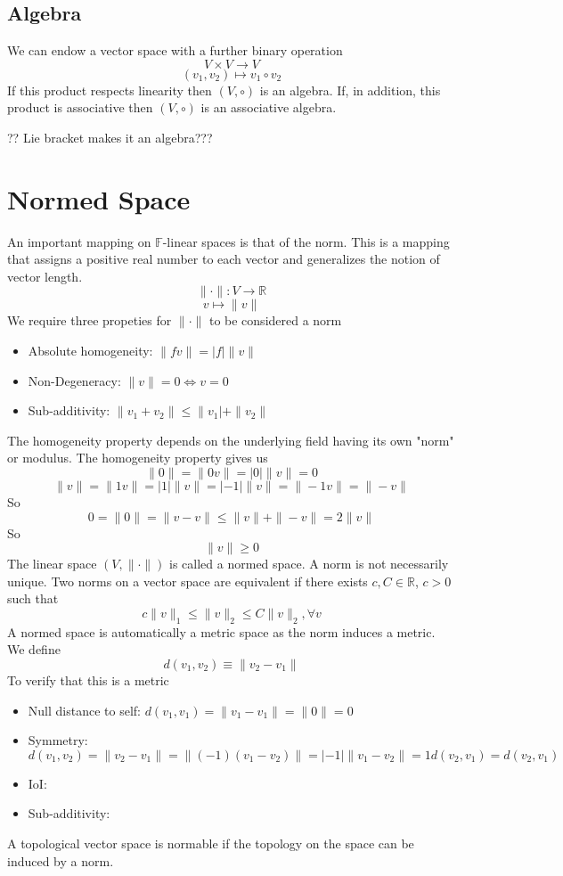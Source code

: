 \documentclass[a4paper]{scrartcl}
\begin{document}
\subsection{Algebra}
We can endow a vector space with a further binary operation
$$V\times V \rightarrow V$$
$$(v_{1},v_{2}) \mapsto v_{1} \circ v_{2}   $$
If this product respects linearity then $(V, \circ)$ is an algebra.
If, in addition, this product is associative then $(V, \circ)$ is an associative algebra.


?? Lie bracket makes it an algebra???







\section{Normed Space}
An important mapping on $\mathbb{F}$-linear spaces is that of the norm. This is a mapping that assigns a positive real number to each vector and generalizes the notion of vector length.
$$\|\cdot\|:V\rightarrow\mathbb{R}$$
$$v \mapsto \|v\|$$
We require three propeties for $\|\cdot\|$ to be considered a norm
\begin{itemize}
\item{Absolute homogeneity: $\|fv\| = |f|\|v\|$}
\item{Non-Degeneracy: $\|v\| = 0 \iff v = 0$}
\item{Sub-additivity: $\|v_{1}+v_{2}\| \leq \|v_{1}| + \|v_{2}\|$ }
\end{itemize}
The homogeneity property depends on the underlying field having its own "norm" or modulus. The homogeneity property gives us
$$\|0\| = \|0v\| = |0|\|v\| = 0$$
$$\|v\| = \|1v\| = |1|\|v\| = |-1|\|v\| = \|-1v\| = \|-v\|$$
So
$$0 = \|0\| = \|v-v\| \leq \|v\| + \|-v\| = 2\|v\|$$
So
$$\|v\| \geq 0$$
The linear space $(V,\|\cdot\|)$ is called a normed space. A norm is not necessarily unique. Two norms on a vector space are equivalent if there exists $c,C\in\mathbb{R}$, $c>0$ such that
$$ c\|v\|_{1} \leq \|v\|_{2} \leq C\|v\|_{2}, \forall v  $$
A normed space is automatically a metric space as the norm induces a metric. We define
$$d(v_{1},v_{2}) \equiv \|v_{2} - v_{1}\|$$
To verify that this is a metric
\begin{itemize}
\item{Null distance to self: $d(v_{1},v_{1}) = \|v_{1} - v_{1}\| = \|0\| = 0 $}
\item{Symmetry: $d(v_{1},v_{2}) = \|v_{2} - v_{1}\| = \| (-1)(v_{1} - v_{2})\| =
|-1|\|v_{1} - v_{2}\| = 1d(v_{2},v_{1}) = d(v_{2},v_{1})$}
\item{IoI:}
\item{Sub-additivity:}
\end{itemize}
A topological vector space is normable if the topology on the space can be induced by a norm.
\end{document}
